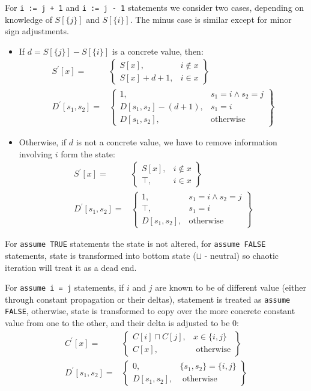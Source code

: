 For \texttt{i := j + 1} and \texttt{i := j - 1} statements we consider two cases, depending on knowledge of $S[\{j\}]$ and $S[\{i\}]$. The minus case is similar except for minor sign adjustments.
\begin{itemize}
\item If $d=S[\{j\}]-S[\{i\}]$ is a concrete value, then:
\begin{align*}
S^\prime[x] = & \left.
	\begin{cases}
		S[x], & i \notin x \\
		S[x] + d + 1, & i \in x
	\end{cases}
\right\}\\
D^\prime[s_1, s_2] = & \left.
	\begin{cases}
		1, & s_1 = i \wedge s_2 = j \\
		D[s_1,s_2] - (d + 1), & s_1 = i \\
		D[s_1,s_2], & \text{otherwise}
	\end{cases}
\right\}
\end{align*}
\item Otherwise, if $d$ is not a concrete value, we have to remove information involving $i$ form the state:
\begin{align*}
S^\prime[x] = & \left.
	\begin{cases}
		S[x], & i \notin x \\
		\top, & i \in x
	\end{cases}
\right\}\\
D^\prime[s_1, s_2] = & \left.
	\begin{cases}
		1, & s_1 = i \wedge s_2 = j \\
		\top, & s_1 = i \\
		D[s_1,s_2], & \text{otherwise}
	\end{cases}
\right\}
\end{align*}
\end{itemize}


For \texttt{assume TRUE} statements the state is not altered, for \texttt{assume FALSE} statements, state is transformed into bottom state ($\sqcup$ - neutral) so chaotic iteration will treat it as a dead end.

For \texttt{assume i = j} statements, if $i$ and $j$ are known to be of different value (either through constant propagation or their deltas), statement is treated as \texttt{assume FALSE}, otherwise, state is transformed to copy over the more concrete constant value from one to the other, and their delta is adjusted to be 0:
\begin{align*}
C^\prime[x] = & \left.
	\begin{cases}
		C[i]\sqcap C[j], & x \in \{i,j\} \\
		C[x], & \text{ otherwise}
	\end{cases}
\right\}\\
D^\prime[s_1,s_2] = & \left.
\begin{cases}
	0, & \{s_1, s_2\} = \{i,j\}\\
	D[s_1,s_2], & \text{ otherwise}
\end{cases}
\right\}
\end{align*}

